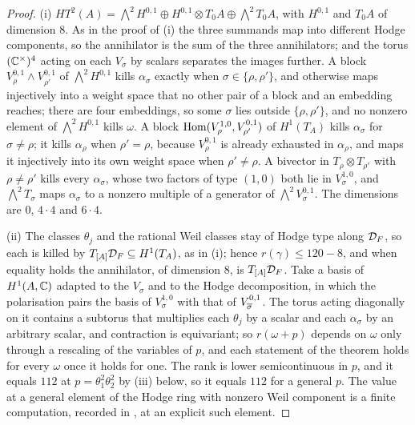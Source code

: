 \begin{proof}
(i) $HT^{2}(A)=\bigwedge^{2}H^{0,1}\oplus H^{0,1}\otimes T_{0}A\oplus
\bigwedge^{2}T_{0}A$, with $H^{0,1}$ and $T_{0}A$ of dimension $8$. As in the
proof of (i) the three summands map into different Hodge
components, so the annihilator is the sum of the three annihilators; and the
torus $(\mathbb{C}^{\times})^{4}$ acting on each $V_{\sigma}$ by scalars separates the
images further. A block $V_{\rho}^{0,1}\wedge V_{\rho'}^{0,1}$ of
$\bigwedge^{2}H^{0,1}$ kills $\alpha_{\sigma}$ exactly when
$\sigma\in\{\rho,\rho'\}$, and otherwise maps injectively into a weight space
that no other pair of a block and an embedding reaches; there are four
embeddings, so some $\sigma$ lies outside $\{\rho,\rho'\}$, and no nonzero
element of $\bigwedge^{2}H^{0,1}$ kills $\omega$. A block
$\operatorname{Hom}(V_{\rho}^{1,0},V_{\rho'}^{0,1})$ of $H^{1}(T_{A})$ kills $\alpha_{\sigma}$
for $\sigma\ne\rho$; it kills $\alpha_{\rho}$ when $\rho'=\rho$, because
$V_{\rho}^{0,1}$ is already exhausted in $\alpha_{\rho}$, and maps it
injectively into its own weight space when $\rho'\ne\rho$. A bivector in
$T_{\rho}\otimes T_{\rho'}$ with $\rho\ne\rho'$ kills every $\alpha_{\sigma}$,
whose two factors of type $(1,0)$ both lie in $V_{\sigma}^{1,0}$, and
$\bigwedge^{2}T_{\sigma}$ maps $\alpha_{\sigma}$ to a nonzero multiple of a
generator of $\bigwedge^{2}V_{\sigma}^{0,1}$. The dimensions are $0$,
$4\cdot4$ and $6\cdot4$.

(ii) The classes $\theta_{j}$ and the rational Weil classes stay of Hodge type
along $\mathcal{D}_{F}$, so each is killed by $T_{[A]}\mathcal{D}_{F}\subseteq H^{1}(T_{A})$, as
in (i); hence $r(\gamma)\le120-8$, and when equality
holds the annihilator, of dimension $8$, is $T_{[A]}\mathcal{D}_{F}$. Take a basis of
$H^{1}(A,\mathbb{C})$ adapted to the $V_{\sigma}$ and to the Hodge decomposition, in
which the polarisation pairs the basis of $V_{\sigma}^{1,0}$ with that of
$V_{\overline{\sigma}}^{0,1}$. The torus acting diagonally on it contains a subtorus
that multiplies each $\theta_{j}$ by a scalar and each $\alpha_{\sigma}$ by an
arbitrary scalar, and contraction is equivariant; so $r(\omega+p)$ depends on
$\omega$ only through a rescaling of the variables of $p$, and each statement
of the theorem holds for every $\omega$ once it holds for one. The rank is
lower semicontinuous in $p$, and it equals $112$ at
$p=\theta_{1}^{2}\theta_{2}^{2}$ by (iii) below, so it
equals $112$ for a general $p$. The value at a general element of the Hodge
ring with nonzero Weil component is a finite computation, recorded in
\cite{BMB26}, at an explicit such element.


\end{proof}
